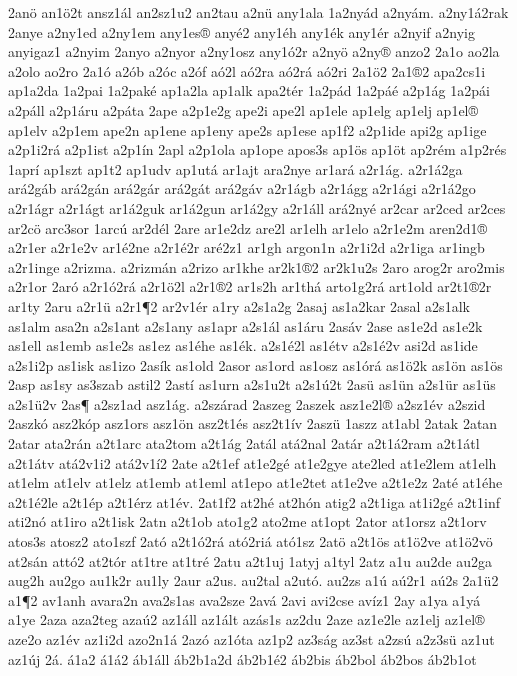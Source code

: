 {2anö
an1ö2t
ansz1ál
an2sz1u2
an2tau
a2nü
any1ala
1a2nyád
a2nyám.
a2ny1á2rak
2anye
a2ny1ed
a2ny1em
any1es®
anyé2
any1éh
any1ék
any1ér
a2nyif
a2nyig
anyigaz1
a2nyim
2anyo
a2nyor
a2ny1osz
any1ó2r
a2nyö
a2ny®
anzo2
2a1o
ao2la
a2olo
ao2ro
2a1ó
a2ób
a2óc
a2óf
aó2l
aó2ra
aó2rá
aó2ri
2a1ö2
2a1®2
apa2cs1i
ap1a2da
1a2pai
1a2paké
ap1a2la
ap1alk
apa2tér
1a2pád
1a2páé
a2p1ág
1a2pái
a2páll
a2p1áru
a2páta
2ape
a2p1e2g
ape2i
ape2l
ap1ele
ap1elg
ap1elj
ap1el®
ap1elv
a2p1em
ape2n
ap1ene
ap1eny
ape2s
ap1ese
ap1f2
a2p1ide
api2g
ap1ige
a2p1i2rá
a2p1ist
a2p1ín
2apl
a2p1ola
ap1ope
apos3s
ap1ös
ap1öt
ap2rém
a1p2rés
1aprí
ap1szt
ap1t2
ap1udv
ap1utá
ar1ajt
ara2nye
ar1ará
a2r1ág.
a2r1á2ga
ará2gáb
ará2gán
ará2gár
ará2gát
ará2gáv
a2r1ágb
a2r1ágg
a2r1ági
a2r1á2go
a2r1ágr
a2r1ágt
ar1á2guk
ar1á2gun
ar1á2gy
a2r1áll
ará2nyé
ar2car
ar2ced
ar2ces
ar2cö
arc3sor
1arcú
ar2dél
2are
ar1e2dz
are2l
ar1elh
ar1elo
a2r1e2m
aren2d1®
a2r1er
a2r1e2v
ar1é2ne
a2r1é2r
aré2z1
ar1gh
argon1n
a2r1i2d
a2r1iga
ar1ingb
a2r1inge
a2rizma.
a2rizmán
a2rizo
ar1khe
ar2k1®2
ar2k1u2s
2aro
arog2r
aro2mis
a2r1or
2aró
a2r1ó2rá
a2r1ö2l
a2r1®2
ar1s2h
ar1thá
arto1g2rá
art1old
ar2t1®2r
ar1ty
2aru
a2r1ü
a2r1¶2
ar2v1ér
a1ry
a2s1a2g
2asaj
as1a2kar
2asal
a2s1alk
as1alm
asa2n
a2s1ant
a2s1any
as1apr
a2s1ál
as1áru
2asáv
2ase
as1e2d
as1e2k
as1ell
as1emb
as1e2s
as1ez
as1éhe
as1ék.
a2s1é2l
as1étv
a2s1é2v
asi2d
as1ide
a2s1i2p
as1isk
as1izo
2asík
as1old
2asor
as1ord
as1osz
as1órá
as1ö2k
as1ön
as1ös
2asp
as1sy
as3szab
astil2
2astí
as1urn
a2s1u2t
a2s1ú2t
2asü
as1ün
a2s1ür
as1üs
a2s1ü2v
2as¶
a2sz1ad
asz1ág.
a2szárad
2aszeg
2aszek
asz1e2l®
a2sz1év
a2szid
2aszkó
asz2kóp
asz1ors
asz1ön
asz2t1és
asz2t1ív
2aszü
1aszz
at1abl
2atak
2atan
2atar
ata2rán
a2t1arc
ata2tom
a2t1ág
2atál
atá2nal
2atár
a2t1á2ram
a2t1átl
a2t1átv
atá2v1i2
atá2v1í2
2ate
a2t1ef
at1e2gé
at1e2gye
ate2led
at1e2lem
at1elh
at1elm
at1elv
at1elz
at1emb
at1eml
at1epo
at1e2tet
at1e2ve
a2t1e2z
2até
at1éhe
a2t1é2le
a2t1ép
a2t1érz
at1év.
2at1f2
at2hé
at2hón
atig2
a2t1iga
at1i2gé
a2t1inf
ati2nó
at1iro
a2t1isk
2atn
a2t1ob
ato1g2
ato2me
at1opt
2ator
at1orsz
a2t1orv
atos3s
atosz2
ato1szf
2ató
a2t1ó2rá
ató2riá
ató1sz
2atö
a2t1ös
at1ö2ve
at1ö2vö
at2sán
attó2
at2tór
at1tre
at1tré
2atu
a2t1uj
1atyj
a1tyl
2atz
a1u
au2de
au2ga
aug2h
au2go
au1k2r
au1ly
2aur
a2us.
au2tal
a2utó.
au2zs
a1ú
aú2r1
aú2s
2a1ü2
a1¶2
av1anh
avara2n
ava2s1as
ava2sze
2avá
2avi
avi2cse
avíz1
2ay
a1ya
a1yá
a1ye
2aza
aza2teg
azaú2
az1áll
az1ált
azás1s
az2du
2aze
az1e2le
az1elj
az1el®
aze2o
az1év
az1i2d
azo2n1á
2azó
az1óta
az1p2
az3ság
az3st
a2zsú
a2z3sü
az1ut
az1új
2á.
á1a2
á1á2
áb1áll
áb2b1a2d
áb2b1é2
áb2bis
áb2bol
áb2bos
áb2b1ot
}
